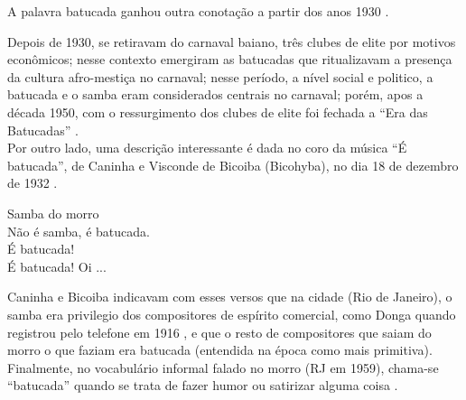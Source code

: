 \begin{description}
A palavra batucada ganhou outra conotação a partir dos anos 1930 \cite[pp. 103]{sandroni2001feitico}.

Depois de 1930, se retiravam do carnaval baiano, três clubes de elite por motivos econômicos; 
nesse contexto emergiram as batucadas que ritualizavam a presença da cultura afro-mestiça no carnaval; 
nesse período, a nível social e politico, a batucada e o samba eram considerados centrais no carnaval; 
porém, apos a década 1950, com o ressurgimento dos clubes de elite foi fechada a ``Era das Batucadas'' \cite{ICKES2013}.\\



Por outro lado, uma descrição interessante é dada no coro da música ``É batucada'', 
de Caninha e Visconde de Bicoiba (Bicohyba), no dia 18 de dezembro de 1932 \cite[pp. 12]{refebatucadajornal}.
\begin{citando}
Samba do morro\\
Não é samba, é batucada.\\
É batucada!\\
É batucada! Oi ...\\
\end{citando}
Caninha e Bicoiba indicavam com esses versos que na cidade (Rio de Janeiro),
o samba era privilegio dos compositores de espírito comercial, 
como Donga quando registrou pelo telefone em 1916 \cite[Cad. B pp. 4]{jornalsambaderoda5},
e que o resto de compositores que saiam do morro o que faziam era batucada 
(entendida na época como mais primitiva).\\




Finalmente, no vocabulário informal falado no morro (RJ em 1959), 
chama-se  ``batucada''
quando se trata de fazer humor ou satirizar alguma coisa \cite[pp. 32]{jornalsambaderoda2}.
\end{description}



